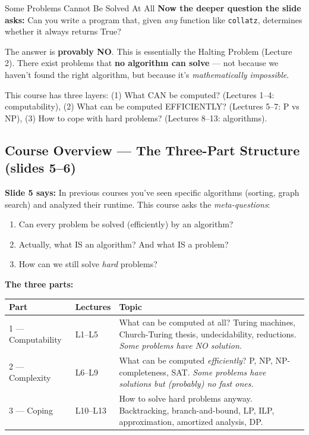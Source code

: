 \documentclass[11pt,a4paper]{article}
\newcommand{\kt}[1]{\par\vspace{0.3em}\colorbox{yellow!60}{\parbox{\dimexpr\linewidth-2\fboxsep}{#1}}\vspace{0.3em}}
\begin{document}
\begin{conceptbox}{Some Problems Cannot Be Solved At All}
\textbf{Now the deeper question the slide asks:} Can you write a program that, given \textit{any} function like \texttt{collatz}, determines whether it always returns True?

The answer is \textbf{provably NO}. This is essentially the Halting Problem (Lecture 2). There exist problems that \textbf{no algorithm can solve} --- not because we haven't found the right algorithm, but because it's \textit{mathematically impossible}.

\kt{This course has three layers: (1) What CAN be computed? (Lectures 1--4: computability), (2) What can be computed EFFICIENTLY? (Lectures 5--7: P vs NP), (3) How to cope with hard problems? (Lectures 8--13: algorithms).}
\end{conceptbox}

\subsection{Course Overview --- The Three-Part Structure (slides 5--6)}

\textbf{Slide 5 says:} In previous courses you've seen specific algorithms (sorting, graph search) and analyzed their runtime. This course asks the \textit{meta-questions}:

\begin{enumerate}[nosep]
\item Can every problem be solved (efficiently) by an algorithm?
\item Actually, what IS an algorithm? And what IS a problem?
\item How can we still solve \textit{hard} problems?
\end{enumerate}

\textbf{The three parts:}

\begin{center}
\renewcommand{\arraystretch}{1.4}
\begin{tabular}{llp{8cm}}
\toprule
\textbf{Part} & \textbf{Lectures} & \textbf{Topic} \\
\midrule
1 --- Computability & L1--L5 & What can be computed at all? Turing machines, Church-Turing thesis, undecidability, reductions. \textit{Some problems have NO solution.} \\
2 --- Complexity & L6--L9 & What can be computed \textit{efficiently}? P, NP, NP-completeness, SAT. \textit{Some problems have solutions but (probably) no fast ones.} \\
3 --- Coping & L10--L13 & How to solve hard problems anyway. Backtracking, branch-and-bound, LP, ILP, approximation, amortized analysis, DP. \\
\bottomrule
\end{tabular}
\end{center}
\end{document}
